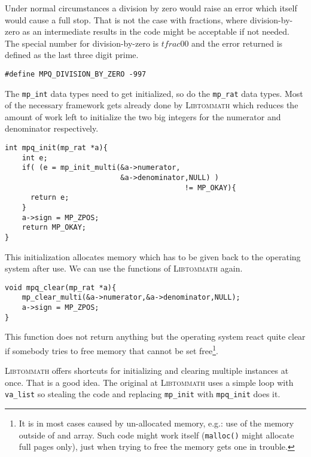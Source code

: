 \documentclass[10pt]{book}
\newcommand{\aname}[1]{{\scshape{#1}}}
\theoremstyle{definition}
\theoremstyle{remark}
\begin{document}
Under normal circumstances a division by zero would raise an error which itself
would cause a full stop. That is not the case with fractions, where
division-by-zero as an intermediate results in the code might be acceptable
if not needed. The special number for division-by-zero is $tfrac{0}{0}$ and
the error returned is defined as the last three digit prime.
 \begin{center}
    \begin{lstlisting}[caption={Division by Zero Error},label=divbyzeroerror]
#define MPQ_DIVISION_BY_ZERO -997
    \end{lstlisting}
  \end{center}
The \lstinline!mp_int! data types need to get initialized, so do the
\lstinline!mp_rat! data types. Most of the necessary framework gets already done
by \aname{Libtommath} which reduces the amount of work left to initialize
the two big integers for the numerator and denominator respectively.
 \begin{center}
    \begin{lstlisting}[caption={Initialize a single Rational},label=initrat]
int mpq_init(mp_rat *a){
    int e;
    if( (e = mp_init_multi(&a->numerator,
                           &a->denominator,NULL) ) 
                                          != MP_OKAY){
      return e;
    }
    a->sign = MP_ZPOS;
    return MP_OKAY;
}
    \end{lstlisting}
  \end{center}
This initialization allocates memory which has to be given back to the operating
system after use. We can use the functions of \aname{Libtommath} again.
 \begin{center}
    \begin{lstlisting}[caption={Free the Memory},label=freerat]
void mpq_clear(mp_rat *a){
    mp_clear_multi(&a->numerator,&a->denominator,NULL);
    a->sign = MP_ZPOS;
}
    \end{lstlisting}
  \end{center}
This function does not return anything but the operating system react quite
clear if somebody tries to free memory that cannot be set free\footnote{It is
in most cases caused by un-allocated memory, e.g.: use of the memory outside of
and array. Such code might work itself (\lstinline!malloc()! might allocate
full pages only), just when trying to free the memory gets one in trouble.}.

\aname{Libtommath} offers shortcuts for initializing and clearing multiple
instances at once. That is a good idea. The original at \aname{Libtommath}
uses a simple loop with \lstinline!va_list! so stealing the code and replacing
\lstinline!mp_init! with \lstinline!mpq_init! does it.
\end{document}
